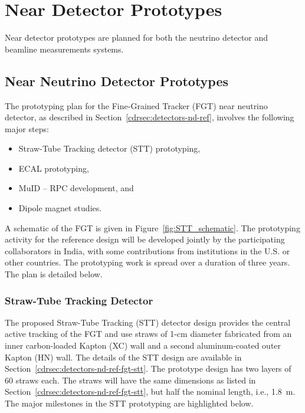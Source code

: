 
\section{Near Detector Prototypes}
\label{sec:proto-nd}
Near detector prototypes are planned for both the neutrino detector and beamline measurements systems.

\subsection{Near Neutrino Detector Prototypes}
\label{sec:proto-nd-nnd}
The prototyping plan for the Fine-Grained Tracker (FGT) near neutrino
detector, as described in Section~\ref{cdrsec:detectors-nd-ref},
involves the following major steps:
\begin{itemize}
\item Straw-Tube Tracking detector (STT) prototyping,
\item ECAL prototyping,
\item MuID -- RPC development, and
\item Dipole magnet studies.
\end{itemize}

A schematic of the FGT is given in Figure~\ref{fig:STT_schematic}. The
prototyping activity for the reference design will be developed
jointly by the participating collaborators in India, with some
contributions from institutions in the U.S. or other countries.  The
prototyping work is spread over a duration of three years. The plan is
detailed below.

\subsubsection{Straw-Tube Tracking Detector}

The proposed Straw-Tube Tracking (STT) detector design
provides the central active tracking of the FGT and use straws of
1-cm diameter fabricated from an inner carbon-loaded Kapton (XC) wall
and a second aluminum-coated outer Kapton (HN) wall. The details of the
STT design are available in
Section~\ref{cdrsec:detectors-nd-ref-fgt-stt}. The prototype design
has two layers of 60 straws each.  The straws will have the
same dimensions as listed in
Section~\ref{cdrsec:detectors-nd-ref-fgt-stt}, but half the nominal
length, i.e., 1.8~m. The major milestones in the STT prototyping
are highlighted below.

